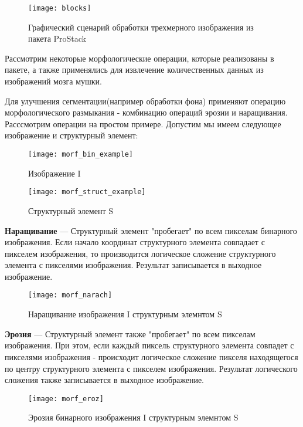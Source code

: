 \begin{figure}[H]
	\centering
	\texttt{[image: blocks]}
	\caption{Графический сценарий обработки трехмерного изображения из пакета ProStack}
	\label{descr}
\end{figure}

Рассмотрим некоторые морфологические операции, которые реализованы в пакете, а также применялись для извлечение количественных данных из изображений мозга мушки.

Для улучшения сегментации(например обработки фона) применяют операцию морфологического размыкания - комбинацию операций эрозии и наращивания. Расссмотрим операции на простом примере. Допустим мы имеем следующее  изображение и структурный элемент: \cite{Incollection}
\begin{figure}[H]
	\texttt{[image: morf\_bin\_example]}
	\caption{Изображение I}\label{morf_bin_example}
	\endminipage\hfill
	\texttt{[image: morf\_struct\_example]}
	\caption{Структурный элемент S}\label{morf_struct_example}
	\endminipage\hfill
\end{figure}

	\textbf{Наращивание} — Структурный элемент "пробегает" по всем пикселам бинарного изображения. Если  начало координат структурного элемента совпадает с пикселем изображения, то производится логическое сложение структурного элемента с пикселями изображения. Результат  записывается в выходное изображение. \cite{Incollection}
	
	\begin{figure}[H]
		\centering
		\texttt{[image: morf\_narach]}
		\caption{Наращивание изображения I структурным элемнтом S}
		\label{morf_narach}
	\end{figure}
	
	\textbf{Эрозия} — Структурный элемент также "пробегает" по всем пикселам изображения. При этом, если каждый пиксель структурного элемента совпадет с пикселями изображения - происходит логическое сложение пикселя находящегося по центру структурного элемента с пикселем изображения. Результат логического сложения также записывается в выходное  изображение. \cite{Incollection}
	
	\begin{figure}[H]
		\centering
		\texttt{[image: morf\_eroz]}
		\caption{Эрозия бинарного изображения I структурным элемнтом S}
		\label{morf_eroz}
	\end{figure}
	

